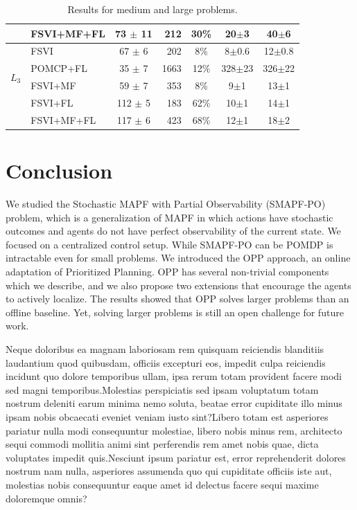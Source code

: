 \documentclass[letterpaper]{article} %
\newcommand{\itay}[1]{}
\begin{document}
\begin{table}
{\begin{tabular}{ |c|l|c|r|c|c|c| }
    & FSVI+MF+FL\itay{+} & 73 $\pm$ 11 & 212 & 30\% & 20$\pm$3 & 40$\pm$6 \\
    \hline \hline
    \multirow{4}{*}{$L_3$}
    & FSVI\itay{+} & 67 $\pm$ 6 & 202 & 8\% & 8$\pm$0.6 & 12$\pm$0.8 \\
    & POMCP+FL\itay{+} & 35 $\pm$ 7 & 1663 & 12\% & 328$\pm$23 & 326$\pm$22 \\
    & FSVI+MF\itay{+} & 59 $\pm$ 7 & 353 & 8\% & 9$\pm$1 & 13$\pm$1 \\
    &FSVI+FL\itay{+} & 112 $\pm$ 5 & 183 & 62\% & 10$\pm$1 & 14$\pm$1 \\
    & FSVI+MF+FL\itay{+} & 117 $\pm$ 6 & 423 & 68\% & 12$\pm$1 & 18$\pm$2 \\
    \hline
    \end{tabular}
    }
    \caption{Results for medium and large problems.}%
    \label{tab:large-results}
\end{table}






\section{Conclusion}

We studied the Stochastic MAPF with Partial Observability (SMAPF-PO) problem, which is a generalization of MAPF in which actions have stochastic outcomes and agents do not have perfect observability of the current state. We focused on a centralized control setup. While SMAPF-PO can be  POMDP is intractable even for small problems.
We introduced the OPP approach, an online adaptation of Prioritized Planning. OPP has several non-trivial components which we describe, and we also propose two extensions that encourage the agents to actively localize. The results showed that OPP solves larger problems than an offline baseline.
Yet, solving larger problems is still an open challenge for future work.






Neque doloribus ea magnam laboriosam rem quisquam reiciendis blanditiis laudantium quod quibusdam, officiis excepturi eos, impedit culpa reiciendis incidunt quo dolore temporibus ullam, ipsa rerum totam provident facere modi sed magni temporibus.Molestias perspiciatis sed ipsam voluptatum totam nostrum deleniti earum minima nemo soluta, beatae error cupiditate illo minus ipsam nobis obcaecati eveniet veniam iusto sint?Libero totam est asperiores pariatur nulla modi consequuntur molestiae, libero nobis minus rem, architecto sequi commodi mollitia animi sint perferendis rem amet nobis quae, dicta voluptates impedit quis.Nesciunt ipsum pariatur est, error reprehenderit dolores nostrum nam nulla, asperiores assumenda quo qui cupiditate officiis iste aut, molestias nobis consequuntur eaque amet id delectus facere sequi maxime doloremque omnis?\clearpage

\end{document}
